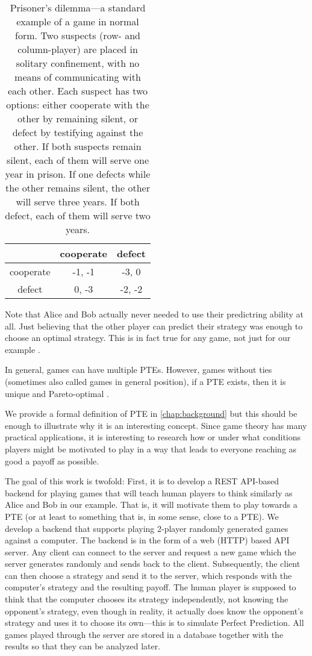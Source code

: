 \begin{table}
	\caption{Prisoner's dilemma---a standard example of a game in normal form.
	Two suspects (row- and column-player) are placed in solitary confinement, with no means of communicating with each other.
	Each suspect has two options: either cooperate with the other by remaining silent, or defect by testifying against the other.
	If both suspects remain silent, each of them will serve one year in prison.
	If one defects while the other remains silent, the other will serve three years.
	If both defect, each of them will serve two years.
	}
	\label{tab:prisoners-dilemma}
	\centering
	\begin{tabular}{|c|c|c|}
	  \hline
				& cooperate & defect \\
	  \hline
	  cooperate & -1, -1    & -3, 0  \\
	  \hline
	  defect    & 0, -3     & -2, -2 \\
	  \hline
	\end{tabular}
  \end{table}

Note that Alice and Bob actually never needed to use their predictring ability at all.
Just believing that the other player can predict their strategy was enough to choose an optimal strategy.
This is in fact true for any game, not just for our example \cite{Fourny20}.

In general, games can have multiple PTEs.
However, games without ties (sometimes also called games in general position), if a PTE exists, then it is unique and Pareto-optimal \cite{Fourny20}.

We provide a formal definition of PTE in \autoref{chap:background} but this should be enough to illustrate why it is an interesting concept.
Since game theory has many practical applications, it is interesting to research how or under what conditions players might be motivated to play in a way that leads to everyone reaching as good a payoff as possible.

The goal of this work is twofold:
First, it is to develop a REST API-based backend for playing games that will teach human players to think similarly as Alice and Bob in our example.
That is, it will motivate them to play towards a PTE (or at least to something that is, in some sense, close to a PTE).
We develop a backend that supports playing 2-player randomly generated games against a computer.
The backend is in the form of a web (HTTP) based API server.
Any client can connect to the server and request a new game which the server generates randomly and sends back to the client.
Subsequently, the client can then choose a strategy and send it to the server, which responds with the computer's strategy and the resulting payoff.
The human player is supposed to think that the computer chooses its strategy independently, not knowing the opponent's strategy, even though in reality, it actually does know the opponent's strategy and uses it to choose its own---this is to simulate Perfect Prediction.
All games played through the server are stored in a database together with the results so that they can be analyzed later.

